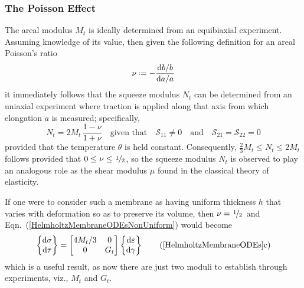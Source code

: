 \subsubsection{The Poisson Effect}
\label{PoissonRatio}

The areal modulus $M_t$ is ideally determined from an equibiaxial experiment.  Assuming knowledge of its value, then given the following definition for an areal Poisson's ratio
\begin{displaymath}
\nu \defeq - \frac{\mathrm{d}b / b}{\mathrm{d}a / a}
\end{displaymath}
it immediately follows that the squeeze modulus $N_t$ can be determined from an uniaxial experiment where traction is applied along that axis from which elongation $a$ is measured; specifically,
\begin{displaymath}
N_t = 2M_t \, \frac{1 - \nu}{1 + \nu} 
\quad \text{given that} \quad
\mathcal{S}_{11} \neq 0 
\quad \text{and} \quad
\mathcal{S}_{21} = \mathcal{S}_{22} = 0 
\end{displaymath}
provided that the temperature $\theta$ is held constant.  Consequently, $\tfrac{2}{3} M_t \leq N_t \leq 2M_t$ follows provided that $0 \leq \nu \leq \textfrac{1}{2}$, so the squeeze modulus $N_t$ is observed to play an analogous role as the shear modulus $\mu$ found in the classical theory of elasticity.  

If one were to consider such a membrane as having uniform thickness $h$ that varies with deformation so as to preserve its volume, then $\nu = \textfrac{1}{2}$ and Eqn.~(\ref{HelmholtzMembraneODEsNonUniform}) would become
\begin{equation}
\left\{ \begin{matrix}
\mathrm{d} \sigma \\ \mathrm{d} \tau
\end{matrix} \right\} = \begin{bmatrix}
4 M_t / 3 & 0 \\
0 & G_t
\end{bmatrix} \left\{ \begin{matrix}
\mathrm{d} \varepsilon \\ \mathrm{d} \gamma
\end{matrix} \right\}
\label{HelmholtzMembraneODEsNonUniformCV}
    \tag{\ref{HelmholtzMembraneODEs}c}
\end{equation}
which is a useful result, as now there are just two moduli to establish through experiments, viz., $M_t$ and $G_t$.

